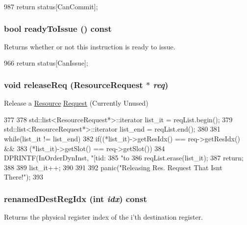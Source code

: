 \begin{DoxyCode}
987 { return status[CanCommit]; }
\end{DoxyCode}
\hypertarget{classInOrderDynInst_a29fcc55658982386428d8035e438589f}{
\subsubsection[{readyToIssue}]{\setlength{\rightskip}{0pt plus 5cm}bool readyToIssue () const}}
\label{classInOrderDynInst_a29fcc55658982386428d8035e438589f}
Returns whether or not this instruction is ready to issue. 


\begin{DoxyCode}
966 { return status[CanIssue]; }
\end{DoxyCode}
\hypertarget{classInOrderDynInst_a2f0511ef9f7325bcf7a8941e371ea85b}{
\subsubsection[{releaseReq}]{\setlength{\rightskip}{0pt plus 5cm}void releaseReq ({\bf ResourceRequest} $\ast$ {\em req})}}
\label{classInOrderDynInst_a2f0511ef9f7325bcf7a8941e371ea85b}
Release a \hyperlink{classResource}{Resource} \hyperlink{classRequest}{Request} (Currently Unused) 


\begin{DoxyCode}
377 {
378     std::list<ResourceRequest*>::iterator list_it = reqList.begin();
379     std::list<ResourceRequest*>::iterator list_end = reqList.end();
380 
381     while(list_it != list_end) {
382         if((*list_it)->getResIdx() == req->getResIdx() &&
383            (*list_it)->getSlot() == req->getSlot()) {
384             DPRINTF(InOrderDynInst, "[tid:%
385                     "to %
386             reqList.erase(list_it);
387             return;
388         }
389         list_it++;
390     }
391 
392     panic("Releasing Res. Request That Isnt There!\n");
393 }
\end{DoxyCode}
\hypertarget{classInOrderDynInst_ab7e10290401d7350e965a28388ad29d8}{
\subsubsection[{renamedDestRegIdx}]{ renamedDestRegIdx (int {\em idx}) const}}
\label{classInOrderDynInst_ab7e10290401d7350e965a28388ad29d8}
Returns the physical register index of the i'th destination register. 


